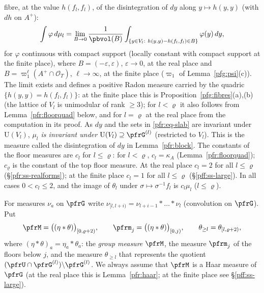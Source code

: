 \documentclass[10pt]{amsart}
\theoremstyle{definition}
\theoremstyle{remark}
\providecommand{\auO}{\mathcal O}
\providecommand{\auU}{\mathrm U}
\begin{document}
fibre, at the value $h(f_l,f_l)$, of the disintegration of $dy$ along $y\mapsto h(y,y)$ (with $dh$ on $A^+$):
\begin{equation}\label{pfr:eq-slab}
\int\varphi\,d\mu_l=\lim_{B\to0}\frac1{\pbvol(B)}\int_{\{y\in V_l:\ h(y,y)-h(f_l,f_l)\in B\}}\varphi(y)\,dy,
\end{equation}
for $\varphi$ continuous with compact support (locally constant with compact support at the finite place), where
$B=(-\varepsilon,\varepsilon)$, $\varepsilon\to0$, at the real place and $B=\varpi_1^{\ell}(A^+\cap\auO_T)$, $\ell\to\infty$, at the
finite place ($\varpi_1$ of Lemma~\ref{pfg:psi}(c)). The limit exists and defines a positive Radon measure carried by
the quadric $\{h(y,y)=h(f_l,f_l)\}$: at the finite place this is Proposition~\ref{pfg:fibres}(a),(b) (the lattice of
$V_l$ is unimodular of rank $\ge3$); for $l<\varrho$ it also follows from Lemma~\ref{pfr:floorquad} below, and for
$l=\varrho$ at the real place from the computation in its proof. As $dy$ and the sets in
\eqref{pfr:eq-slab} are invariant under $\auU(V_l)$, \emph{$\mu_l$ is invariant under $\auU(V_l)\supseteq\pfrG^{(l)}$}
(restricted to $V_l$). This is the measure called the disintegration of $dy$ in Lemma~\ref{pfr:block}.
The constants of the floor measures are $c_l$ for $l\le\varrho$: for $l<\varrho$, $c_l=\kappa_A$ (Lemma~\ref{pfr:floorquad});
$c_\varrho$ is the constant of the top floor measure. At the real place $c_l=2$ for all $l\le\varrho$
(\S\ref{pfr:ss-realforms}); at the finite place $c_l=1$ for all $l\le\varrho$ (\S\ref{pff:ss-large}). In all cases
$0<c_l\le2$, and the image of $\theta_l$ under $\sigma\mapsto\sigma^{-1}f_l$ is $c_l\mu_l$ ($l\le\varrho$).

For measures $\nu_a$ on $\pfrG$ write
$\nu_{[l,l+i)}=\nu_{l+i-1}*\dots*\nu_l$ (convolution on $\pfrG$). Put
\[
\pfrM=\bigl((\eta*\theta)\bigr)_{[0,\varrho+2)},\qquad\pfrm_j=\bigl((\eta*\theta)\bigr)_{[0,j)},\qquad
\theta_{\ge l}=\theta_{[l,\varrho+2)},
\]
where $(\eta*\theta)_a=\eta_a*\theta_a$: the \emph{group measure} $\pfrM$, the measure $\pfrm_j$ of the
floors below $j$, and the measure $\theta_{\ge l}$ that represents the quotient
$(\pfrU\cap\pfrG^{(l)})\backslash\pfrG^{(l)}$. We always assume that $\pfrM$ is a Haar measure of
$\pfrG$ (at the real place this is Lemma~\ref{pfr:haar}; at the finite place see \S\ref{pff:ss-large}).
\end{document}
